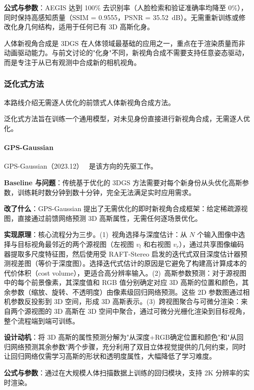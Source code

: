 \textbf{公式与参数}：AEGIS 达到 100\% 去识别率（人脸检索和验证准确率均降至 0\%），同时保持高感知质量（SSIM = 0.9555，PSNR = 35.52~dB）。无需重新训练或修改化身几何结构，适用于任何已有 3D 高斯化身。

人体新视角合成是 3DGS 在人体领域最基础的应用之一，重点在于渲染质量而非动画驱动能力。与前文讨论的"化身"不同，新视角合成不需要支持任意姿态驱动，而是专注于从已有观测中合成新的相机视角。

\subsubsection{泛化式方法}

本路线介绍无需逐人优化的前馈式人体新视角合成方法。

泛化式方法旨在训练一个通用模型，对未见身份直接进行新视角合成，无需逐人优化。

\paragraph{GPS-Gaussian}

GPS-Gaussian（2023.12）~\cite{2312_02155} 是该方向的先驱工作。

\textbf{Baseline 与问题}：传统基于优化的 3DGS 方法需要对每个新身份从头优化高斯参数，训练耗时数分钟到数十分钟，完全无法满足实时应用需求。

\textbf{改了什么}：GPS-Gaussian 提出了无需优化的即时新视角合成框架：给定稀疏源视图，直接通过前馈网络预测 3D 高斯属性，无需任何逐场景优化。

\textbf{实现原理}：核心流程分为三步。(1)~视角选择与深度估计：从 $N$ 个输入图像中选择与目标视角最邻近的两个源视图（左视图 $v_l$ 和右视图 $v_r$），通过共享图像编码器提取多尺度特征图，然后使用受 RAFT-Stereo 启发的迭代式双目深度估计器预测视差图（等价于深度图）。选择迭代式估计的原因是它避免了构建高计算成本的代价体积（cost volume），更适合高分辨率输入。(2)~高斯参数预测：对于源视图中的每个前景像素，其深度值和 RGB 值分别确定对应 3D 高斯的位置和颜色，其余参数（缩放、旋转、不透明度）由像素级回归网络预测。这些 2D 参数图通过相机参数反投影到 3D 空间，形成 3D 高斯表示。(3)~跨视图聚合与可微分渲染：来自两个源视图的 3D 高斯在 3D 空间中聚合，通过可微分光栅化渲染到目标视角，整个流程端到端可训练。

\textbf{设计动机}：将 3D 高斯的属性预测分解为"从深度+RGB确定位置和颜色"和"从回归网络预测其余参数"两个步骤，充分利用了双目立体视觉提供的几何约束，同时让回归网络仅需学习高斯的形状和透明度属性，大幅降低了学习难度。

\textbf{公式与参数}：通过在大规模人体扫描数据上训练的回归模块，支持 2K 分辨率的实时渲染。

